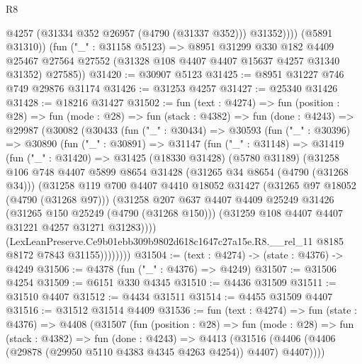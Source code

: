 \begin{lexlean}{R8}
\begin{coremodule}
                @4257
                (@31334 @352 @26957 (@4790 (@31337 @352)))
                @31352))))
        (@5891 @31310))
      (fun ("_" : @31158 @5123) =>
      @8951
        @31299
        @330
        @182
        @4409
        @25467
        @27564
        @27552
        (@31328 @108 @4407 @4407 @15637 @4257 @31340 @31352)
        @27585))
@31420 := @30907 @5123
@31425 := @8951 @31227 @746 @749 @29876 @31174
@31426 := @31253 @4257
@31427 := @25340 @31426
@31428 := @18216 @31427
@31502 := fun (text : @4274) =>
  fun (position : @28) =>
  fun (mode : @28) =>
  fun (stack : @4382) =>
  fun (done : @4243) =>
  @29987
    (@30082
      (@30433
        (fun ("_" : @30434) =>
        @30593
          (fun ("_" : @30396) =>
          @30890
            (fun ("_" : @30891) =>
            @31147
              (fun ("_" : @31148) =>
              @31419
                (fun ("_" : @31420) =>
                @31425
                  (@18330 @31428)
                  (@5780 @31189)
                  (@31258
                    @106
                    @748
                    @4407
                    @5899
                    @8654
                    @31428
                    (@31265 @34 @8654 (@4790 (@31268 @34)))
                    (@31258
                      @119
                      @700
                      @4407
                      @4410
                      @18052
                      @31427
                      (@31265 @97 @18052 (@4790 (@31268 @97)))
                      (@31258
                        @207
                        @637
                        @4407
                        @4409
                        @25249
                        @31426
                        (@31265 @150 @25249 (@4790 (@31268 @150)))
                        (@31259 @108 @4407 @4407 @31221 @4257 @31271 @31283))))
                  (LexLeanPreserve.Ce9b01ebb309b9802d618c1647c27a15e.R8.__rel_11
                    @8185
                    @8172
                    @7843
                    @31155))))))))
@31504 := (text : @4274) -> (state : @4376) -> @4249
@31506 := @4378 (fun ("_" : @4376) => @4249)
@31507 := @31506 @4254
@31509 := @6151 @330 @4345
@31510 := @4436 @31509
@31511 := @31510 @4407
@31512 := @4434 @31511
@31514 := @4455 @31509 @4407
@31516 := @31512 @31514 @4409
@31536 := fun (text : @4274) =>
  fun (state : @4376) =>
  @4408
    (@31507
      (fun (position : @28) =>
      fun (mode : @28) =>
      fun (stack : @4382) =>
      fun (done : @4243) =>
      @4413 (@31516 (@4406 (@4406 (@29878 (@29950 @5110 @4383 @4345 @4263 @4254)) @4407) @4407))))

\end{coremodule}
\end{lexlean}
